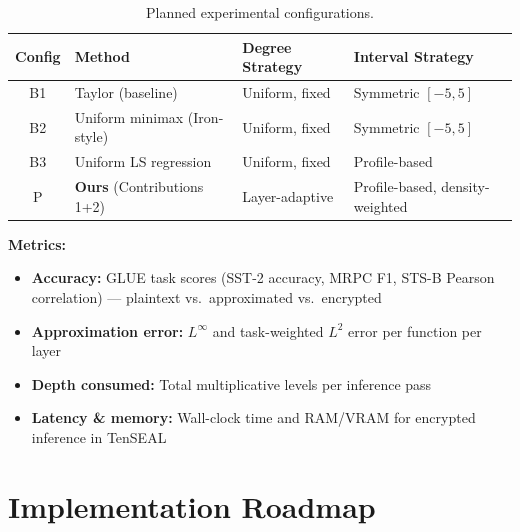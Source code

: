 \documentclass[12pt, a4paper]{article}
\begin{document}
\begin{table}[ht]
\centering
\caption{Planned experimental configurations.}
\label{tab:configs}
\renewcommand{\arraystretch}{1.3}
\begin{tabular}{clll}
\toprule
\textbf{Config} & \textbf{Method} & \textbf{Degree Strategy} & \textbf{Interval Strategy} \\
\midrule
B1 & Taylor (baseline) & Uniform, fixed & Symmetric $[-5,5]$ \\
B2 & Uniform minimax (Iron-style) & Uniform, fixed & Symmetric $[-5,5]$ \\
B3 & Uniform LS regression & Uniform, fixed & Profile-based \\
\rowcolor{green!8}
P  & \textbf{Ours} (Contributions 1+2) & Layer-adaptive & Profile-based, density-weighted \\
\bottomrule
\end{tabular}
\end{table}

\medskip
\noindent\textbf{Metrics:}
\begin{itemize}[leftmargin=2em]
  \item \textbf{Accuracy:} GLUE task scores (SST-2 accuracy, MRPC F1, STS-B Pearson correlation) — plaintext vs.\ approximated vs.\ encrypted
  \item \textbf{Approximation error:} $L^\infty$ and task-weighted $L^2$ error per function per layer
  \item \textbf{Depth consumed:} Total multiplicative levels per inference pass
  \item \textbf{Latency \& memory:} Wall-clock time and RAM/VRAM for encrypted inference in TenSEAL
\end{itemize}

\section{Implementation Roadmap}
\end{document}
